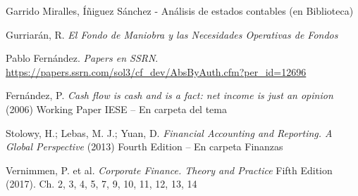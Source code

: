 \documentclass{nuevotema}
\begin{document}
Garrido Miralles, Íñiguez Sánchez - Análisis de estados contables (en Biblioteca)

Gurriarán, R. \textit{El Fondo de Maniobra y las Necesidades Operativas de Fondos} 

Pablo Fernández. \textit{Papers en SSRN}. \url{https://papers.ssrn.com/sol3/cf_dev/AbsByAuth.cfm?per_id=12696}

Fernández, P. \textit{Cash flow is cash and is a fact: net income is just an opinion} (2006) Working Paper IESE -- En carpeta del tema

Stolowy, H.; Lebas, M. J.; Yuan, D. \textit{Financial Accounting and Reporting. A Global Perspective} (2013) Fourth Edition -- En carpeta Finanzas

Vernimmen, P. et al. \textit{Corporate Finance. Theory and Practice} Fifth Edition (2017). Ch. 2, 3, 4, 5, 7, 9, 10, 11, 12, 13, 14
\end{document}
